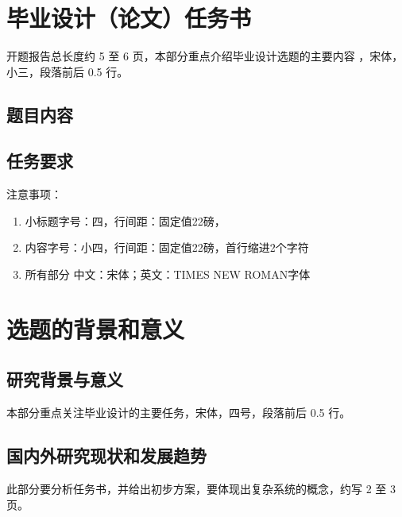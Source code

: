 \documentclass[UTF8,AutoFakeBold,AutoFakeSlant,zihao=-4]{ctexart}
\newcommand{\upcite}[1]{\textsuperscript{\cite{#1}}}  %
\begin{document}




\pagestyle{fancy}
\setcounter{page}{1}
\fancyhf{}

\fancyfoot[C]{\fontsize{9pt}{9pt}\selectfont{\thepage}}
\renewcommand{\headrulewidth}{0pt}
\renewcommand{\footrulewidth}{0pt}

\setlength{\parskip}{0em}
\renewcommand{\baselinestretch}{1.53}
\setlength{\parindent}{1.02cm}

\section{毕业设计（论文）任务书}
开题报告总长度约 5 至 6 页，本部分重点介绍毕业设计选题的主要内容 \upcite{LeCun2010}，宋体，小三，段落前后 0.5 行。

\subsection{题目内容}
\subsection{任务要求}
\noindent 注意事项：
\begin{enumerate}
	\item 小标题字号：四，行间距：固定值22磅，
	\item 内容字号：小四，行间距：固定值22磅，首行缩进2个字符  
	\item 所有部分  中文：宋体；英文：TIMES NEW ROMAN字体
\end{enumerate}

\section{选题的背景和意义}
\subsection{研究背景与意义}
本部分重点关注毕业设计的主要任务，宋体，四号，段落前后 0.5 行。

\subsection{国内外研究现状和发展趋势}
此部分要分析任务书，并给出初步方案，要体现出复杂系统的概念，约写 2 至 3 页。
\end{document}
